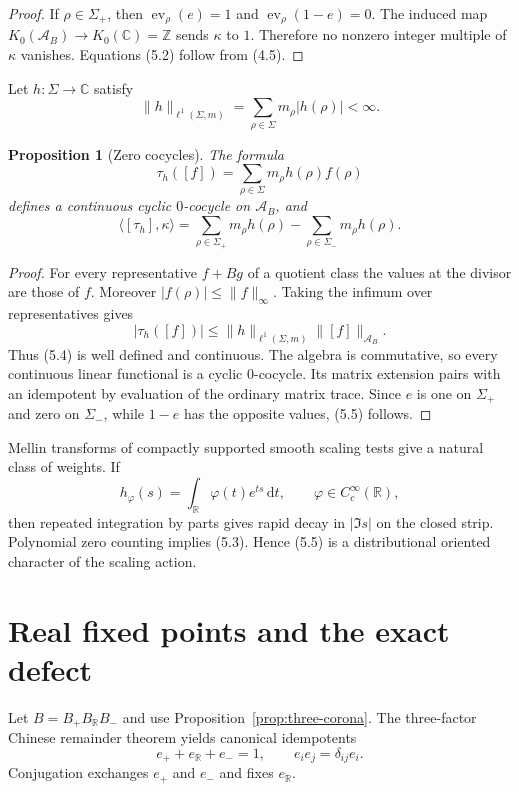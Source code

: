 \documentclass[11pt]{article}
\newtheorem{proposition}[theorem]{Proposition}
\theoremstyle{definition}
\theoremstyle{remark}
\newcommand{\C}{\mathbb C}
\newcommand{\R}{\mathbb R}
\newcommand{\Z}{\mathbb Z}
\newcommand{\A}{\mathcal A}
\newcommand{\ev}{\operatorname{ev}}
\newcommand{\dd}{\,\mathrm d}
\begin{document}
\begin{proof}
If $\rho\in\Sigma_+$, then $\ev_\rho(e)=1$ and
$\ev_\rho(1-e)=0$.  The induced map
$K_0(\A_B)\to K_0(\C)=\Z$ sends $\kappa$ to $1$.  Therefore no nonzero integer
multiple of $\kappa$ vanishes.  Equations (5.2) follow from (4.5).
\end{proof}

Let $h:\Sigma\to\C$ satisfy
\[
                   \|h\|_{\ell^1(\Sigma,m)}
                   =\sum_{\rho\in\Sigma}m_\rho|h(\rho)|<\infty. \tag{5.3}
\]

\begin{proposition}[Zero cocycles]\label{prop:zero-cocycle}
The formula
\[
       \tau_h([f])=\sum_{\rho\in\Sigma}m_\rho h(\rho)f(\rho)    \tag{5.4}
\]
defines a continuous cyclic $0$-cocycle on $\A_B$, and
\[
 \langle[\tau_h],\kappa\rangle
 =\sum_{\rho\in\Sigma_+}m_\rho h(\rho)
  -\sum_{\rho\in\Sigma_-}m_\rho h(\rho).              \tag{5.5}
\]
\end{proposition}

\begin{proof}
For every representative $f+Bg$ of a quotient class the values at the divisor
are those of $f$.  Moreover $|f(\rho)|\le\|f\|_\infty$.  Taking the infimum over
representatives gives
\[
       |\tau_h([f])|\le \|h\|_{\ell^1(\Sigma,m)}\|[f]\|_{\A_B}.
\]
Thus (5.4) is well defined and continuous.  The algebra is commutative, so every
continuous linear functional is a cyclic $0$-cocycle.  Its matrix extension
pairs with an idempotent by evaluation of the ordinary matrix trace.  Since $e$
is one on $\Sigma_+$ and zero on $\Sigma_-$, while $1-e$ has the opposite
values, (5.5) follows.
\end{proof}

Mellin transforms of compactly supported smooth scaling tests give a natural
class of weights.  If
\[
                h_\varphi(s)=\int_\R\varphi(t)e^{ts}\dd t,
                \qquad \varphi\in C_c^\infty(\R),     \tag{5.6}
\]
then repeated integration by parts gives rapid decay in $|\Im s|$ on the closed
strip.  Polynomial zero counting implies (5.3).  Hence (5.5) is a distributional
oriented character of the scaling action.

\section{Real fixed points and the exact defect}

Let $B=B_+B_{\R}B_-$ and use Proposition~\ref{prop:three-corona}.  The
three-factor Chinese remainder theorem yields canonical idempotents
\[
 e_++e_{\R}+e_-=1,
 \qquad e_ie_j=\delta_{ij}e_i.                        \tag{6.1}
\]
Conjugation exchanges $e_+$ and $e_-$ and fixes $e_{\R}$.
\end{document}

